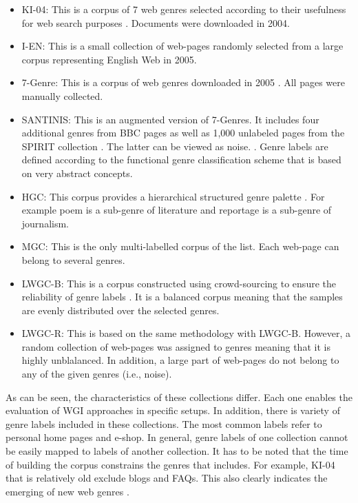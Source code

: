 \begin{itemize}
\begin{end}
\begin{itemize}
    \item KI-04: This is a corpus of 7 web genres selected according to their usefulness for web search  purposes . Documents were downloaded in 2004.
    \item I-EN: This is a small collection of web-pages randomly selected from a large corpus representing English Web in 2005.    \item 7-Genre: This is a corpus of web genres downloaded in 2005 . All pages were manually collected. 
    \item SANTINIS: This is an augmented version of 7-Genres. It includes four additional genres from BBC pages as well as 1,000 unlabeled pages from the SPIRIT collection . The latter can be viewed as noise.
    . Genre labels are defined according to the functional genre classification scheme that is based on very abstract concepts.
    \item HGC: This corpus provides a hierarchical structured genre palette  . For example poem is a sub-genre of literature and reportage is a sub-genre of journalism.
    \item MGC: This is the only multi-labelled corpus of the list. Each web-page can belong to several genres. 
    \item LWGC-B: This is a corpus constructed using crowd-sourcing to ensure the reliability of genre labels . It is a balanced corpus meaning that the samples are evenly distributed over the selected genres.
    \item LWGC-R: This is based on the same methodology with LWGC-B. However, a random collection of web-pages was assigned to genres meaning that it is highly unblalanced. In addition, a large part of web-pages do not belong to any of the given genres (i.e., noise).
\end{itemize}

As can be seen, the characteristics of these collections differ. Each one enables the evaluation of WGI approaches in specific setups. In addition, there is variety of genre labels included in these collections. The most common labels refer to personal home pages and e-shop. In general, genre labels of one collection cannot be easily mapped to labels of another collection. It has to be noted that the time of building the corpus constrains the genres that includes. For example, KI-04 that is relatively old exclude blogs and FAQs. This also clearly indicates the emerging of new web genres \parencite{dash2018history}. 


\end{end}
\end{itemize}
